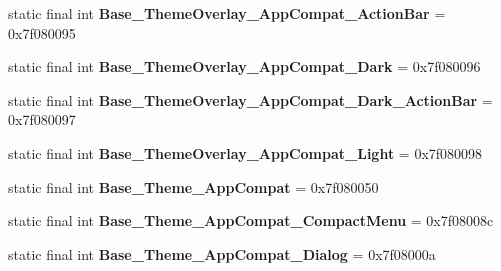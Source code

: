\begin{DoxyCompactItemize}
\item 
\hypertarget{classandroid_1_1support_1_1design_1_1_r_1_1style_a49d2551281a2c988061aae003f74c3f9}{}static final int {\bfseries Base\+\_\+\+Theme\+Overlay\+\_\+\+App\+Compat\+\_\+\+Action\+Bar} = 0x7f080095\label{classandroid_1_1support_1_1design_1_1_r_1_1style_a49d2551281a2c988061aae003f74c3f9}

\item 
\hypertarget{classandroid_1_1support_1_1design_1_1_r_1_1style_afb4e6370b2f51731f72ec339323a5457}{}static final int {\bfseries Base\+\_\+\+Theme\+Overlay\+\_\+\+App\+Compat\+\_\+\+Dark} = 0x7f080096\label{classandroid_1_1support_1_1design_1_1_r_1_1style_afb4e6370b2f51731f72ec339323a5457}

\item 
\hypertarget{classandroid_1_1support_1_1design_1_1_r_1_1style_a1981c4bc88e3e9762aee9a2a5644ce44}{}static final int {\bfseries Base\+\_\+\+Theme\+Overlay\+\_\+\+App\+Compat\+\_\+\+Dark\+\_\+\+Action\+Bar} = 0x7f080097\label{classandroid_1_1support_1_1design_1_1_r_1_1style_a1981c4bc88e3e9762aee9a2a5644ce44}

\item 
\hypertarget{classandroid_1_1support_1_1design_1_1_r_1_1style_a78157e543905b00fcad717119cee6e6b}{}static final int {\bfseries Base\+\_\+\+Theme\+Overlay\+\_\+\+App\+Compat\+\_\+\+Light} = 0x7f080098\label{classandroid_1_1support_1_1design_1_1_r_1_1style_a78157e543905b00fcad717119cee6e6b}

\item 
\hypertarget{classandroid_1_1support_1_1design_1_1_r_1_1style_a0ecc8c4b192cb936ce1a2d29da08d931}{}static final int {\bfseries Base\+\_\+\+Theme\+\_\+\+App\+Compat} = 0x7f080050\label{classandroid_1_1support_1_1design_1_1_r_1_1style_a0ecc8c4b192cb936ce1a2d29da08d931}

\item 
\hypertarget{classandroid_1_1support_1_1design_1_1_r_1_1style_a5e099ee9a441023f84d082b6ea016c0c}{}static final int {\bfseries Base\+\_\+\+Theme\+\_\+\+App\+Compat\+\_\+\+Compact\+Menu} = 0x7f08008c\label{classandroid_1_1support_1_1design_1_1_r_1_1style_a5e099ee9a441023f84d082b6ea016c0c}

\item 
\hypertarget{classandroid_1_1support_1_1design_1_1_r_1_1style_adb73b5d52d821420c1e34cfaabb62587}{}static final int {\bfseries Base\+\_\+\+Theme\+\_\+\+App\+Compat\+\_\+\+Dialog} = 0x7f08000a\label{classandroid_1_1support_1_1design_1_1_r_1_1style_adb73b5d52d821420c1e34cfaabb62587}


\end{DoxyCompactItemize}
